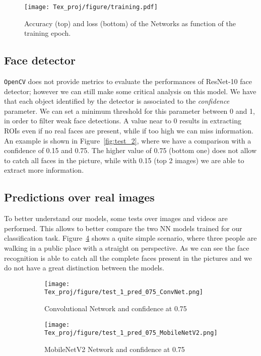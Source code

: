 \documentclass[10pt,twocolumn,letterpaper]{article}
\begin{document}
\begin{figure}[htp]
    \centering
    \texttt{[image: Tex\_proj/figure/training.pdf]}
    \caption{Accuracy (top) and loss (bottom) of the Networks as function of the training epoch.}
    \label{fig:loss_train}
\end{figure}

\subsection{Face detector}
\texttt{OpenCV} does not provide metrics to evaluate the performances of ResNet-10 face detector; however we can still make some critical analysis on this model. We have that each object identified by the detector is associated to the \textit{confidence} parameter. We can set a minimum threshold for this parameter between 0 and 1, in order to filter weak face detections. A value near to 0 results in extracting ROIs even if no real faces are present, while if too high we can miss information. An example is shown in Figure~\ref{fig:test_2}, where we have a comparison with a confidence of 0.15 and 0.75. The higher value of 0.75 (bottom one) does not allow to catch all faces in the picture, while with 0.15 (top 2 images) we are able to extract more information.

\subsection{Predictions over real images}
\label{sec:images}
To better understand our models, some tests over images and videos are performed. This allows to better compare the two NN models trained for our classification task. Figure~\ref{fig:test_1} shows a quite simple scenario, where three people are walking in a public place with a straight on perspective. As we can see the face recognition is able to catch all the complete faces present in the pictures and we do not have a great distinction between the models. 

\begin{figure}[htp]
     \centering
     \begin{subfigure}[b]{0.4\textwidth}
         \centering
         \texttt{[image: Tex\_proj/figure/test\_1\_pred\_075\_ConvNet.png]}
         \caption{Convolutional Network and confidence at 0.75}
         \label{fig:conv_75_1}
     \end{subfigure}
     \begin{subfigure}[b]{0.4\textwidth}
         \centering
         \texttt{[image: Tex\_proj/figure/test\_1\_pred\_075\_MobileNetV2.png]}
         \caption{MobileNetV2 Network and confidence at 0.75}
         \label{fig:MN_75_1}
     \end{subfigure}
     \caption{}
     \label{fig:test_1}
\end{figure}
\end{document}
